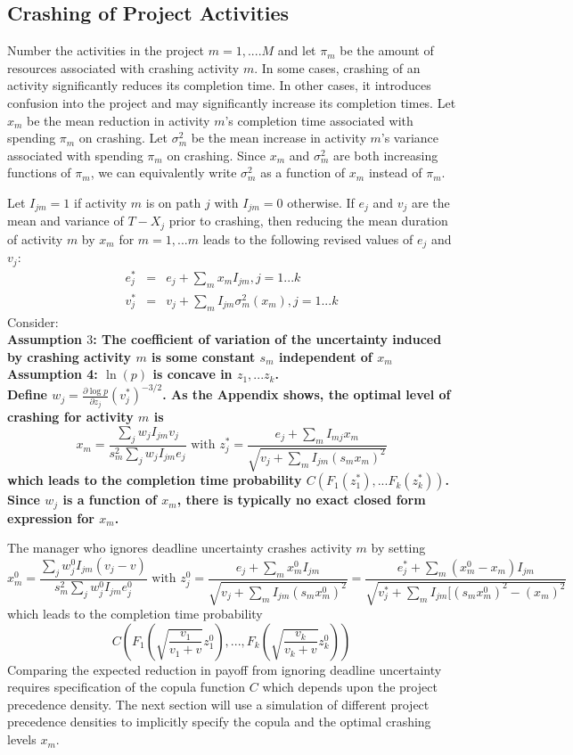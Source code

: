 \documentclass[11pt]{article}
\begin{document}
\subsection{Crashing of Project Activities}
Number the activities in the project $m=1,....M$ and let $\pi_m$ be the amount of resources associated with crashing activity $m$.   In some cases, crashing of an activity significantly reduces its completion time.  In other cases, it introduces confusion into the project and may significantly increase its completion times. Let $x_m$ be the mean reduction in activity $m$'s completion time associated with spending $\pi_m$ on crashing. Let $\sigma^2_m$ be the mean increase in activity $m$'s variance associated with spending $\pi_m$ on crashing.  Since $x_m$ and $\sigma^2_m$ are both increasing functions of $\pi_m$, we can equivalently write $\sigma^2_m$ as a function of $x_m$ instead of $\pi_m$.   \par
Let $I_{jm}=1$ if activity $m$ is on path $j$ with $I_{jm}=0$ otherwise. If $e_j$ and $v_j$ are the mean and variance of $T-X_j$ prior to crashing, then reducing the mean duration of activity $m$ by $x_m$ for $m=1,...m$ leads to the following revised values of $e_j$ and $v_j$:
\begin{eqnarray*}
e^*_j &=& e_j+\sum_m x_m I_{jm}, j=1...k \\
v^*_j &=& v_j+\sum_m I_{jm} \sigma^2_m (x_m), j=1...k
\end{eqnarray*}
Consider: \\
\bf Assumption $3$: \rm The coefficient of variation of the uncertainty induced by crashing activity $m$ is some constant $s_m$ independent of $x_m$ 
\\ \bf Assumption 4: \rm  $\ln(p)$ is concave in $z_1,...z_k$. \\
Define  $w_j =\frac{\partial \log p}{\partial z_j} (v^*_j)^{-3/2}$.  As the Appendix shows, 
the optimal level of crashing for activity $m$ is $$x_m=\frac{\sum_j w_j I_{jm} v_j}{s^2_m \sum_j w_j I_{jm} e_j} \mbox{ with }
z^*_j = \frac{e_j+\sum_m I_{mj} x_m}{\sqrt{v_j+\sum_m I_{jm} (s_m x_m)^2}}  $$
which leads to the completion time probability
$C(F_1(z^*_1),...F_k(z^*_k))$.  Since $w_j$ is a function of $x_m$, there is typically no exact closed form expression for $x_m$. 
\par
The manager who ignores deadline uncertainty crashes activity $m$ by setting
$$x^0_m=\frac{\sum_j w^0_j I_{jm} (v_j-v)}{s^2_m \sum_j w^0_j I_{jm} e^0_j}  \mbox{ with }
z^0_j = \frac{e_j+\sum_m x^0_m I_{jm}}{\sqrt{v_j+\sum_m I_{jm} (s_m x^0_m)^2}}=
\frac{e^*_j+\sum_m (x^0_m-x_m) I_{jm}}{\sqrt{v^*_j+\sum_m I_{jm} [(s_m x^0_m)^2-(x_m)^2}}
$$
which leads to the completion time probability
$$C(F_1(\sqrt{\frac{v_1}{v_1+v}} z^0_1),...,F_k(\sqrt{\frac{v_k}{v_k+v}} z^0_k)) $$
Comparing the expected reduction in payoff from ignoring deadline uncertainty requires specification of the copula function $C$ which depends upon the project precedence density.  The next section will use a simulation of different project precedence densities to implicitly specify the copula and the optimal crashing levels $x_m$.
\end{document}
